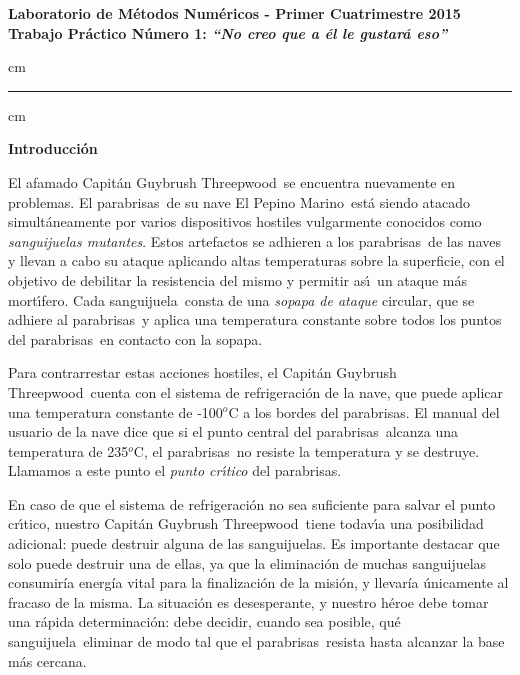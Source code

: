 
\newcommand{\real}{\mathbb{R}}
\newcommand{\nat}{\mathbb{N}}

\newcommand{\atacante}{sanguijuela}
\newcommand{\capitan}{Capit\'an Guybrush Threepwood}
\newcommand{\objeto}{parabrisas}
\newcommand{\nave}{El Pepino Marino}
\newcommand{\titulotp}{``No creo que a \'el le gustar\'a eso''}

\newcommand{\revJ}[1]{{\color{red} #1}}

\addtolength{\topmargin}{-1cm}
\addtolength{\textheight}{2.2cm}
\addtolength{\textwidth}{-.5cm}


\begin{centering}
\large\bf Laboratorio de M\'etodos Num\'ericos - Primer Cuatrimestre 2015 \\
\large\bf Trabajo Pr\'actico N\'umero 1: \emph{\titulotp}\\
\end{centering}

 cm
\hrule
{} cm

{\noindent \bf Introducci\'on}

El afamado \capitan\ se encuentra nuevamente en problemas. El
\objeto\ de su nave \nave\ est\'a siendo atacado simult\'aneamente por varios
dispositivos hostiles vulgarmente conocidos como \emph{\atacante s
mutantes}. Estos artefactos se adhieren a los \objeto\ de las naves y
llevan a cabo su ataque aplicando altas temperaturas sobre la superficie, con
el objetivo de debilitar la resistencia del mismo y permitir as\'\i \
un ataque m\'as mort\'\i fero. Cada \atacante\ consta de una \emph{sopapa
de ataque} circular, que se adhiere al \objeto\ y aplica una temperatura
constante sobre todos los puntos del \objeto\ en contacto con la sopapa.

Para con\-tra\-rres\-tar estas acciones hostiles, el \capitan\ cuenta con el sistema de refrigeraci\'on de la nave, que puede aplicar una temperatura constante de -100${}^o$C a los bordes del \objeto.
El manual del usuario de la nave dice que si el punto central del \objeto\ 
alcanza una temperatura de 235${}^o$C, el \objeto\ no resiste la temperatura
y se destruye. Llamamos a este punto el \emph{punto cr\'\i tico} del
\objeto.

En caso de que el sistema de refrigeraci\'on no sea suficiente para salvar
el punto cr\'\i tico, nues\-tro \capitan\ tiene todav\'\i a una posibilidad
adicional: puede des\-tru\-ir alguna de las \atacante s. Es importante destacar que solo puede destruir una de ellas, ya que la eliminaci\'on de muchas \atacante s consumir\'ia  energ\'ia vital para la finalizaci\'on  de la misi\'on, y llevar\'ia \'unicamente al fracaso de la misma.
La situaci\'on es desesperante, y nuestro h\'eroe debe tomar una r\'apida
determinaci\'on: debe decidir, cuando sea posible, qu\'e \atacante\ eliminar de modo tal que el \objeto\ resista hasta alcanzar la base m\'as cercana.


